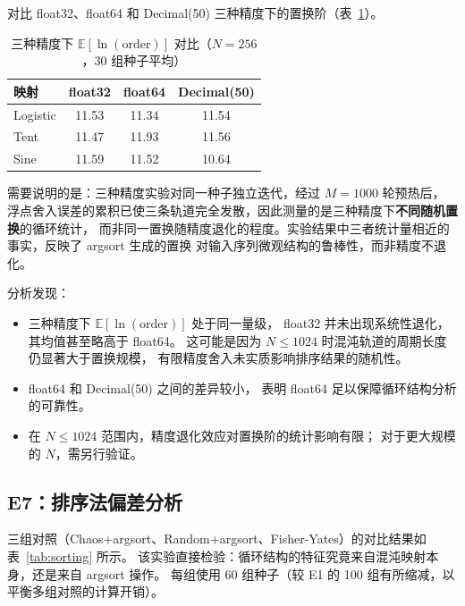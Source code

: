 \documentclass[12pt,a4paper]{ctexrep}
\begin{document}
对比 float32、float64 和 Decimal(50) 三种精度下的置换阶（表~\ref{tab:precision}）。

\begin{table}[H]
  \centering
  \caption{三种精度下 $\mathbb{E}[\ln(\text{order})]$ 对比（$N=256$，30 组种子平均）}
  \label{tab:precision}
  \begin{tabular}{lccc}
    \toprule
    映射 & float32 & float64 & Decimal(50) \\
    \midrule
    Logistic & 11.53 & 11.34 & 11.54 \\
    Tent & 11.47 & 11.93 & 11.56 \\
    Sine & 11.59 & 11.52 & 10.64 \\
    \bottomrule
  \end{tabular}
\end{table}

需要说明的是：三种精度实验对同一种子独立迭代，经过 $M=1000$ 轮预热后，
浮点舍入误差的累积已使三条轨道完全发散，因此测量的是三种精度下\textbf{不同随机置换}的循环统计，
而非同一置换随精度退化的程度。实验结果中三者统计量相近的事实，反映了 argsort 生成的置换
对输入序列微观结构的鲁棒性，而非精度不退化。

分析发现：
\begin{itemize}
  \item 三种精度下 $\mathbb{E}[\ln(\text{order})]$ 处于同一量级，
  float32 并未出现系统性退化，其均值甚至略高于 float64。
  这可能是因为 $N\leq 1024$ 时混沌轨道的周期长度仍显著大于置换规模，
  有限精度舍入未实质影响排序结果的随机性。
  \item float64 和 Decimal(50) 之间的差异较小，
  表明 float64 足以保障循环结构分析的可靠性。
  \item 在 $N\leq 1024$ 范围内，精度退化效应对置换阶的统计影响有限；
  对于更大规模的 $N$，需另行验证。
\end{itemize}

\subsection{E7：排序法偏差分析}

三组对照（Chaos+argsort、Random+argsort、Fisher-Yates）的对比结果如表~\ref{tab:sorting} 所示。
该实验直接检验：循环结构的特征究竟来自混沌映射本身，还是来自 argsort 操作。
每组使用 60 组种子（较 E1 的 100 组有所缩减，以平衡多组对照的计算开销）。
\end{document}
